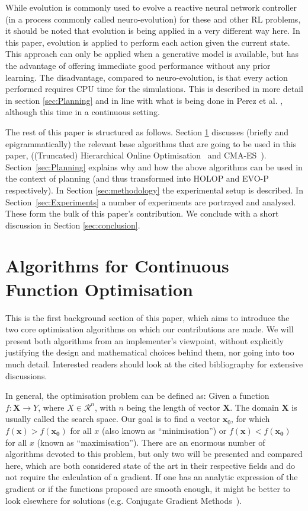 \documentclass[conference]{IEEEtran}
\begin{document}
While evolution is commonly used to evolve a reactive neural network controller (in a process commonly called neuro-evolution) for these and other RL problems,
it should be noted that evolution is being applied in a very different way here. In this paper, evolution is applied to perform each action given the current state.  This approach can only be applied when a generative
model is available, but has the advantage of offering immediate good performance without any
prior learning.  The disadvantage, compared to neuro-evolution, is that every action performed requires
CPU time for the simulations.  This is described in more detail in section \ref{sec:Planning} and in line with what is being done in Perez et al. \cite{perez2013rolling}, although this time in a continuous setting. 

The rest of this paper is structured as follows.  Section \ref{sec:Optimisation} discusses (briefly and epigrammatically) the relevant base algorithms that are going to be used in this paper, ((Truncated) Hierarchical Online Optimisation~\cite{hoo2011} and CMA-ES~\cite{hansen2003reducing}).
Section~\ref{sec:Planning} explains why and how the above algorithms can be used in the context of planning (and thus transformed into HOLOP and EVO-P respectively).  In Section \ref{sec:methodology} the experimental setup is described. In Section~\ref{sec:Experiments} a number of experiments are portrayed and analysed.  These form the bulk of this paper's contribution. We conclude with a short discussion in Section \ref{sec:conclusion}. 

\section{Algorithms for Continuous Function Optimisation} \label{sec:Optimisation}

This is the first background section of this paper, which aims to introduce the two core optimisation algorithms on which our contributions are made. We will present both algorithms from an implementer's viewpoint, without explicitly justifying the design and mathematical choices behind them, nor going into too much detail. Interested readers should look at the cited bibliography for extensive discussions. 

In general, the optimisation problem can be defined as: Given a function $f:\bm{X}\rightarrow Y $, where $X \in \mathcal{R}^n$, with $n$ being the length of vector $\bm{X}$. The domain $\bm{X}$ is usually called the search space. Our goal is to find a vector $\bm{x}_0$, for which $f(\bm{x}) > f(\bm{x_0}) $ for all $x$ (also known as ``minimisation'') or $f(\bm{x}) < f(\bm{x_0})$ for all $x$ (known as ``maximisation'').
There are an enormous number of algorithms devoted to this problem, but only two will be presented and compared here, which are both considered state of the art in their respective fields and do not require the calculation of a gradient. If one has an analytic expression of the gradient or if the functions proposed are smooth enough, it might be better to look elsewhere for solutions (e.g. Conjugate Gradient Methods~\cite{shewchuk1994introduction}).
\end{document}
